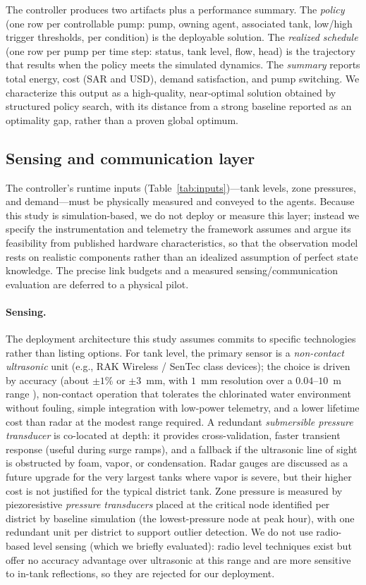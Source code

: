 \documentclass[11pt,a4paper]{article}
\begin{document}
The controller produces two artifacts plus a performance summary. The
\emph{policy} (one row per controllable pump: pump, owning agent, associated
tank, low/high trigger thresholds, per condition) is the deployable solution. The
\emph{realized schedule} (one row per pump per time step: status, tank level,
flow, head) is the trajectory that results when the policy meets the simulated
dynamics. The \emph{summary} reports total energy, cost (SAR and USD), demand
satisfaction, and pump switching. We characterize this output as a high-quality,
near-optimal solution obtained by structured policy search, with its distance
from a strong baseline reported as an optimality gap, rather than a proven global
optimum.

\subsection{Sensing and communication layer}
\label{sec:sensing}
The controller's runtime inputs (Table~\ref{tab:inputs})---tank levels, zone
pressures, and demand---must be physically measured and conveyed to the agents.
Because this study is simulation-based, we do not deploy or measure this layer;
instead we specify the instrumentation and telemetry the framework assumes and
argue its feasibility from published hardware characteristics, so that the
observation model rests on realistic components rather than an idealized
assumption of perfect state knowledge. The precise link budgets and a measured
sensing/communication evaluation are deferred to a physical pilot.

\paragraph{Sensing.} The deployment architecture this study assumes commits to
specific technologies rather than listing options. For tank level, the primary
sensor is a \emph{non-contact ultrasonic} unit (e.g., RAK Wireless / SenTec class
devices); the choice is driven by accuracy (about $\pm1\%$ or $\pm3$~mm, with
$1$~mm resolution over a $0.04$--$10$~m range \citep{SenTec2025Ultrasonic}),
non-contact operation that tolerates the chlorinated water environment without
fouling, simple integration with low-power telemetry, and a lower lifetime cost
than radar at the modest range required. A redundant \emph{submersible pressure
transducer} is co-located at depth: it provides cross-validation, faster transient
response (useful during surge ramps), and a fallback if the ultrasonic line of
sight is obstructed by foam, vapor, or condensation. Radar gauges are discussed
as a future upgrade for the very largest tanks where vapor is severe, but their
higher cost is not justified for the typical district tank. Zone pressure is
measured by piezoresistive \emph{pressure transducers} placed at the critical
node identified per district by baseline simulation (the lowest-pressure node at
peak hour), with one redundant unit per district to support outlier detection. We
do not use radio-based level sensing (which we briefly evaluated): radio level
techniques exist but offer no accuracy advantage over ultrasonic at this range
and are more sensitive to in-tank reflections, so they are rejected for our
deployment.
\end{document}
